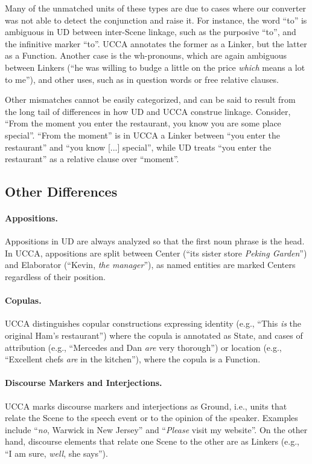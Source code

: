 \documentclass[11pt,a4paper]{article}
\begin{document}
Many of the unmatched units of these types are due to cases where our converter was not able to detect the conjunction 
and raise it. 
For instance, the word ``to'' is ambiguous in UD between inter-Scene linkage, such as the purposive ``to'', and
the infinitive marker ``to''. UCCA annotates the former as a Linker, but the latter as a Function.
Another case is the wh-pronouns, which are again ambiguous between Linkers (``he was willing to budge a little on the price {\it which} means a lot to me''),
and other uses, such as in question words or free relative clauses.

Other mismatches cannot be easily categorized, and can be said to result from the long tail of differences in how UD and UCCA construe linkage.
Consider, ``From the moment you enter the restaurant, you know you are some place special''. ``From the moment'' is in UCCA
a Linker between ``you enter the restaurant'' and ``you know [...] special'', while UD treats ``you enter the restaurant'' as a relative
clause over ``moment''.


    

\subsection{Other Differences}\label{sec:misc}

\paragraph{Appositions.}
    Appositions in UD are always analyzed so that the first
    noun phrase is the head. 
    In UCCA, appositions are split between Center
    (``its sister store \textit{Peking Garden}'')
    and Elaborator (``Kevin, \textit{the manager}''),
    as named entities are marked Centers regardless of their position.

\paragraph{Copulas.}
    UCCA distinguishes copular constructions expressing
    identity (e.g., ``This \textit{is} the original Ham's restaurant'') where the copula is annotated as State,
    and cases of attribution 
    (e.g., ``Mercedes and Dan \textit{are} very thorough'')
    or location (e.g., ``Excellent chefs \textit{are} in the kitchen''),
    where the copula is a Function.

\paragraph{Discourse Markers and Interjections.}
    UCCA marks discourse markers and interjections as Ground, i.e., units that relate the Scene 
    to the speech event or to the opinion of the speaker. Examples include ``\textit{no}, Warwick in New Jersey'' and ``\textit{Please} visit my website''.
    On the other hand, discourse elements that relate one Scene to the other 
    are as Linkers (e.g., ``I am sure, \textit{well}, she says'').
\end{document}
